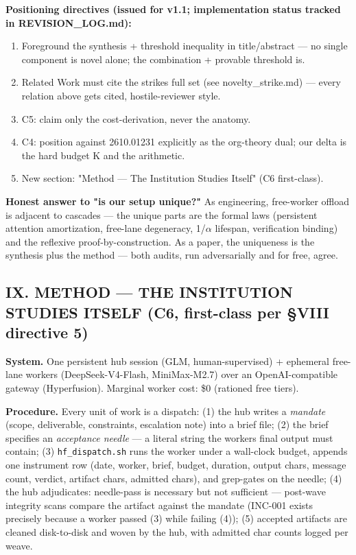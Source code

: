 \documentclass[
]{article}
\providecommand{\tightlist}{%
  \setlength{\itemsep}{0pt}\setlength{\parskip}{0pt}}
\begin{document}
\textbf{Positioning directives (issued for v1.1; implementation status
tracked in REVISION\_LOG.md):}

\begin{enumerate}
\def\labelenumi{\arabic{enumi}.}
\tightlist
\item
  Foreground the synthesis + threshold inequality in title/abstract ---
  no single component is novel alone; the combination + provable
  threshold is.
\item
  Related Work must cite the strike\textquotesingle s full set (see
  novelty\_strike.md) --- every relation above gets cited,
  hostile-reviewer style.
\item
  C5: claim only the cost-derivation, never the anatomy.
\item
  C4: position against 2610.01231 explicitly as the org-theory dual; our
  delta is the hard budget K and the arithmetic.
\item
  New section: "Method --- The Institution Studies Itself" (C6
  first-class).
\end{enumerate}

\textbf{Honest answer to "is our setup unique?"} As engineering,
free-worker offload is adjacent to cascades --- the unique parts are the
formal laws (persistent attention amortization, free-lane degeneracy,
1/$\alpha$ lifespan, verification binding) and the reflexive
proof-by-construction. As a paper, the uniqueness is the synthesis plus
the method --- both audits, run adversarially and for free, agree.

\subsection{IX. METHOD --- THE INSTITUTION STUDIES ITSELF (C6,
first-class per \S{}VIII directive
5)}\label{ix-method--the-institution-studies-itself-c6-first-class-per-viii-directive-5}

\textbf{System.} One persistent hub session (GLM, human-supervised) +
ephemeral free-lane workers (DeepSeek-V4-Flash, MiniMax-M2.7) over an
OpenAI-compatible gateway (Hyperfusion). Marginal worker cost: \$0
(rationed free tiers).

\textbf{Procedure.} Every unit of work is a dispatch: (1) the hub writes
a \emph{mandate} (scope, deliverable, constraints, escalation note) into
a brief file; (2) the brief specifies an \emph{acceptance needle} --- a
literal string the worker\textquotesingle s final output must contain;
(3) \texttt{hf\_dispatch.sh} runs the worker under a wall-clock budget,
appends one instrument row (date, worker, brief, budget, duration,
output chars, message count, verdict, artifact chars, admitted chars),
and grep-gates on the needle; (4) the hub adjudicates: needle-pass is
necessary but not sufficient --- post-wave integrity scans compare the
artifact against the mandate (INC-001 exists precisely because a worker
passed (3) while failing (4)); (5) accepted artifacts are cleaned
disk-to-disk and woven by the hub, with admitted char counts logged per
weave.
\end{document}
